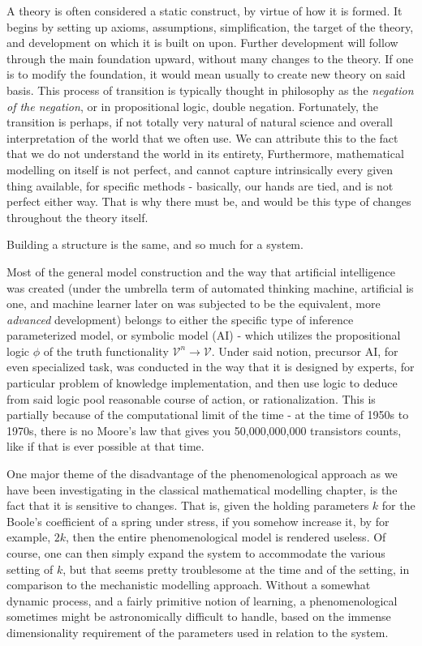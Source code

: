 A theory is often considered a static construct, by virtue of how it is formed. It begins by setting up axioms, assumptions, simplification, the target of the theory, and development on which it is built on upon. Further development will follow through the main foundation upward, without many changes to the theory. If one is to modify the foundation, it would mean usually to create new theory on said basis. This process of transition is typically thought in philosophy as the \textit{negation of the negation}, or in propositional logic, double negation. Fortunately, the transition is perhaps, if not totally very natural of natural science and overall interpretation of the world that we often use. We can attribute this to the fact that we do not understand the world in its entirety, Furthermore, mathematical modelling on itself is not perfect, and cannot capture intrinsically every given thing available, for specific methods - basically, our hands are tied, and is not perfect either way. That is why there must be, and would be this type of changes throughout the theory itself. 

Building a structure is the same, and so much for a system. 

Most of the general model construction and the way that artificial intelligence was created (under the umbrella term of automated thinking machine, artificial is one, and machine learner later on was subjected to be the equivalent, more \textit{advanced} development) belongs to either the specific type of inference parameterized model, or symbolic model (AI) - which utilizes the propositional logic $\phi$ of the truth functionality $\mathcal{V}^{n}\to \mathcal{V}$. Under said notion, precursor AI, for even specialized task, was conducted in the way that it is designed by experts, for particular problem of knowledge implementation, and then use logic to deduce from said logic pool reasonable course of action, or rationalization. This is partially because of the computational limit of the time - at the time of 1950s to 1970s, there is no Moore's law that gives you 50,000,000,000 transistors counts, like if that is ever possible at that time. 

One major theme of the disadvantage of the phenomenological approach as we have been investigating in the classical mathematical modelling chapter, is the fact that it is sensitive to changes. That is, given the holding parameters $k$ for the Boole's coefficient of a spring under stress, if you somehow increase it, by for example, $2k$, then the entire phenomenological model is rendered useless. Of course, one can then simply expand the system to accommodate the various setting of $k$, but that seems pretty troublesome at the time and of the setting, in comparison to the mechanistic modelling approach. Without a somewhat dynamic process, and a fairly primitive notion of learning, a phenomenological sometimes might be astronomically difficult to handle, based on the immense dimensionality requirement of the parameters used in relation to the system.


